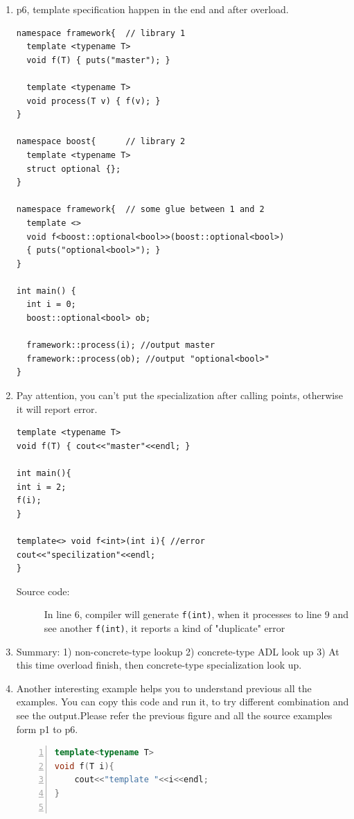 \documentclass[a4paper,11pt,twoside]{book}
\begin{document}
\begin{itemize}
\begin{enumerate}
\item p6, template specification happen in the end and after overload. 
\begin{lstlisting}[]
namespace framework{  // library 1
  template <typename T>
  void f(T) { puts("master"); }
 
  template <typename T>
  void process(T v) { f(v); } 
}
 
namespace boost{      // library 2
  template <typename T>
  struct optional {};
}
 
namespace framework{  // some glue between 1 and 2
  template <>
  void f<boost::optional<bool>>(boost::optional<bool>)
  { puts("optional<bool>"); }
}
 
int main() {
  int i = 0;
  boost::optional<bool> ob;
  
  framework::process(i); //output master
  framework::process(ob); //output "optional<bool>"
}
\end{lstlisting}

			
		\item Pay attention, you can't put the specialization after calling points, otherwise it will report error. 
\begin{lstlisting}
template <typename T>
void f(T) { cout<<"master"<<endl; }

int main(){
int i = 2;
f(i);
}

template<> void f<int>(int i){ //error
cout<<"specilization"<<endl;
}
\end{lstlisting}
\begin{description}
	\item[Source code:] In line 6, compiler will generate \texttt{f(int)}, when it processes to line 9 and see another \texttt{f(int)}, it reports a kind of "duplicate" error
\end{description}

	\item Summary: 1) non-concrete-type lookup 2) concrete-type ADL look up 3) At this time overload finish, then concrete-type specialization look up.


\item Another interesting example helps you to understand previous all the examples. You can copy this code and run it, to try different combination and see the output.Please refer the previous figure and all the source examples form p1 to p6. 
\begin{lstlisting}[frame=single, language=c++, numbers=left,
stepnumber=1,]
template<typename T>
void f(T i){
	cout<<"template "<<i<<endl;
}


\end{lstlisting}
\end{enumerate}
\end{itemize}
\end{document}
